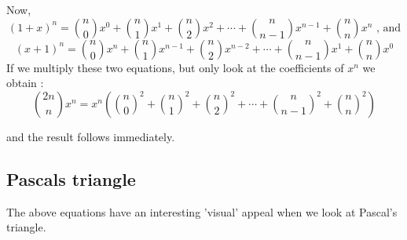 Now,
\begin{equation*}
(1 + x)^n = \binom{n}{0}x^0 + \binom{n}{1}x^1 + \binom{n}{2}x^2 + \cdots + \binom{n}{n-1}x^{n-1} + \binom{n}{n}x^n  \text{ , and}   
\end{equation*}
\begin{equation*}
(x + 1)^n = \binom{n}{0}x^n + \binom{n}{1}x^{n-1} + \binom{n}{2}x^{n-2} + \cdots + \binom{n}{n-1}x^1 + \binom{n}{n}x^0   
\end{equation*}
If we multiply these two equations, but only look at the coefficients of $x^n$ we obtain : 
\begin{equation*}
\binom{2n}{n} x^n = x^n\left(\binom{n}{0}^2 + \binom{n}{1}^2 + \binom{n}{2}^2 + \cdots + \binom{n}{n-1}^2 + \binom{n}{n}^2 \right) 
\end{equation*}

and the result follows immediately.
\clearpage  %
\subsection{Pascals triangle}

The above equations have an interesting 'visual' appeal when we look at Pascal's triangle.

